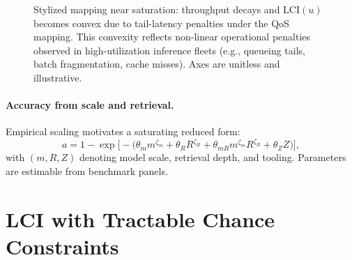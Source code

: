 \documentclass[12pt]{article}
\numberwithin{equation}{section}
\theoremstyle{definition}
\theoremstyle{plain}
\newcommand{\LCI}{\mathrm{LCI}}
\begin{document}
\begin{figure}[t]
\centering
{}
\caption{Stylized mapping near saturation: throughput decays and $\LCI(u)$ becomes convex due to tail-latency penalties under the QoS mapping. This convexity reflects non-linear operational penalties observed in high-utilization inference fleets (e.g., queueing tails, batch fragmentation, cache misses). Axes are unitless and illustrative.}
\label{fig:convex}
\end{figure}

\paragraph{Accuracy from scale and retrieval.}
Empirical scaling motivates a saturating reduced form:
\begin{equation}\label{eq:acc}
a
= 1-\exp\!\Big[-\big(\theta_m m^{\zeta_m}+\theta_R R^{\zeta_R}+\theta_{mR} m^{\zeta_m}R^{\zeta_R}+\theta_Z Z\big)\Big],
\end{equation}
with $(m,R,Z)$ denoting model scale, retrieval depth, and tooling. Parameters are estimable from benchmark panels.

\section{LCI with Tractable Chance Constraints}
\end{document}
